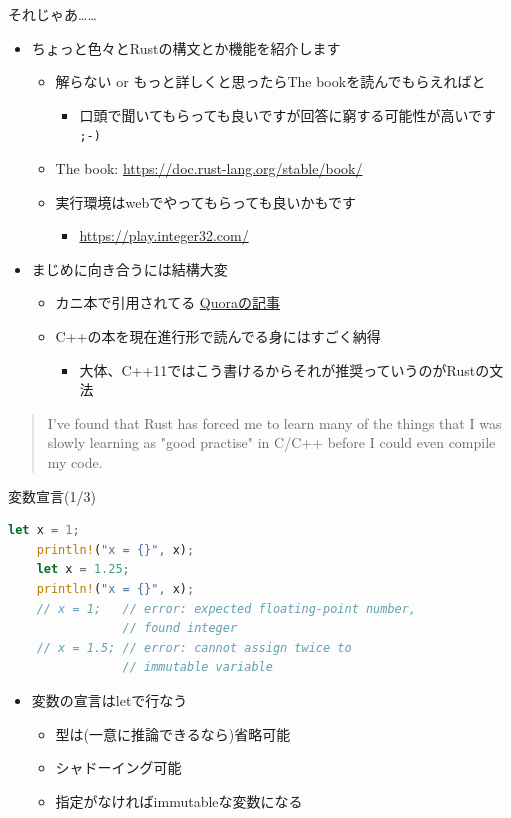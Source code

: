 \documentclass[cjk,dvipdfmx,10pt,compress,fragile%
hyperref={bookmarks=true,bookmarksnumbered=true,bookmarksopen=false,%
colorlinks=false,%
pdftitle={第 134 回 関西 Debian 勉強会},%
pdfauthor={小林},%
pdfsubject={資料},%
}]{beamer}
\begin{document}
\begin{frame}[t,fragile]{それじゃあ……}
\begin{itemize}
 \item ちょっと色々とRustの構文とか機能を紹介します
       \begin{itemize}
	\item 解らない or もっと詳しくと思ったらThe bookを読んでもらえればと
	      \begin{itemize}
	       \item 口頭で聞いてもらっても良いですが回答に窮する可能性が高いです \verb|;-)|
	      \end{itemize}
	\item The book: \url{https://doc.rust-lang.org/stable/book/}
	\item 実行環境はwebでやってもらっても良いかもです
	      \begin{itemize}
	       \item \url{https://play.integer32.com/}
	      \end{itemize}
       \end{itemize}
 \item まじめに向き合うには結構大変
       \begin{itemize}
	\item カニ本で引用されてる
	      \href{https://www.quora.com/What-do-C-C++-systems-programmers-think-of-Rust/answer/Mitchell-Nordine}{Quoraの記事}
	\item C++の本を現在進行形で読んでる身にはすごく納得
	      \begin{itemize}
	       \item 大体、C++11ではこう書けるからそれが推奨っていうのがRustの文法
	      \end{itemize}
       \end{itemize}
\end{itemize}
\begin{quote}
I've found that Rust has forced me to learn many of the things that I was slowly learning as "good practise" in C/C++ before I could even compile my code.
\end{quote}
\end{frame}

\begin{frame}[t,fragile]{変数宣言(1/3)}
\begin{lstlisting}[language=Rust,style=boxed,style=colouredRust]
    let x = 1;
    println!("x = {}", x);
    let x = 1.25;
    println!("x = {}", x);
    // x = 1;   // error: expected floating-point number,
                // found integer
    // x = 1.5; // error: cannot assign twice to
                // immutable variable\end{lstlisting}
\begin{itemize}
 \item 変数の宣言はletで行なう
       \begin{itemize}
	\item 型は(一意に推論できるなら)省略可能
	\item シャドーイング可能
	\item 指定がなければimmutableな変数になる
       \end{itemize}
\end{itemize}
\end{frame}
\end{document}
